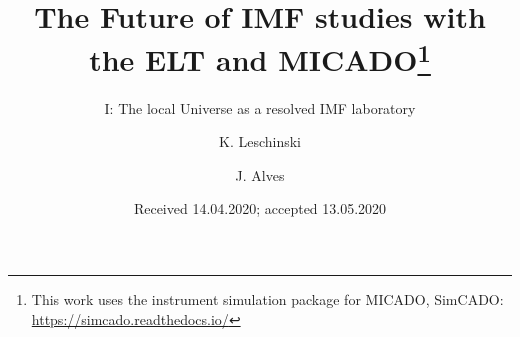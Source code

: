 \documentclass{aa}
\begin{document}
  \title{The Future of IMF studies with the ELT and MICADO\thanks{This work uses the instrument simulation package for MICADO, SimCADO: \url{https://simcado.readthedocs.io/}}}
  \subtitle{I: The local Universe as a resolved IMF laboratory}
  \author{K. Leschinski
     \and
          J. Alves
     }


  \date{Received 14.04.2020; accepted 13.05.2020}

\end{document}
